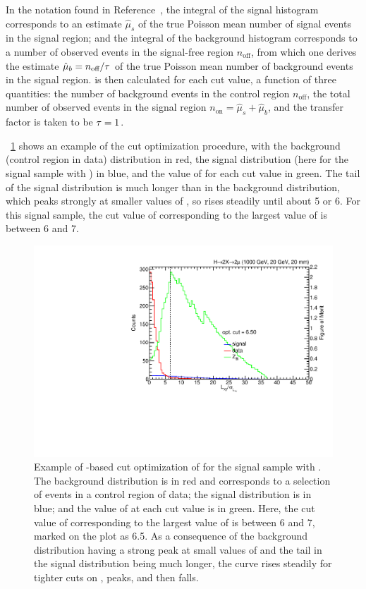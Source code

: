 In the notation found in Reference~\cite{Cousins:ZBi2008}, the integral of the signal histogram corresponds to an estimate $\hat{\mu}_s$ of the true Poisson mean number of signal events in the signal region;
and the integral of the background histogram corresponds to a number of observed events in the signal-free region $n_\text{off}$, from which one derives the estimate $\hat{\mu}_b = n_\text{off}/\tau$ of the true Poisson mean number of background events in the signal region.
\ZBi is then calculated for each cut value, a function of three quantities: the number of background events in the control region $n_\text{off}$, the total number of observed events in the signal region $n_\text{on} = \hat{\mu}_s + \hat{\mu}_b$, and the transfer factor is taken to be $\tau = 1$.

\Fig~\ref{fig:dd:CutOptExample} shows an example of the cut optimization procedure, with the background (control region in data) distribution in red, the signal distribution (here for the \twoMu signal sample with ) in blue, and the value of \ZBi for each cut value in green.
The tail of the signal distribution is much longer than in the background distribution, which peaks strongly at smaller values of \LxySig, so \ZBi rises steadily until about 5 or 6.
For this signal sample, the cut value of \LxySig corresponding to the largest value of \ZBi is between 6 and 7.

\begin{figure}[htpb]
  \centering
  \includegraphics[width=\DFigWidth]{figures/displaced/OPT_LxySig_ZBi_HTo2XTo2Mu2J_1000_20_20.pdf}
  \caption[Example of \ZBi-based cut optimization of \LxySig.]{Example of \ZBi-based cut optimization of \LxySig for the \twoMu signal sample with . The background distribution is in red and corresponds to a selection of events in a control region of data; the signal distribution is in blue; and the value of \ZBi at each cut value is in green. Here, the cut value of \LxySig corresponding to the largest value of \ZBi is between 6 and 7, marked on the plot as 6.5. As a consequence of the background distribution having a strong peak at small values of \LxySig and the tail in the signal distribution being much longer, the \ZBi curve rises steadily for tighter cuts on \LxySig, peaks, and then falls.}
  \label{fig:dd:CutOptExample}
\end{figure}

